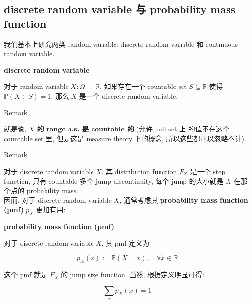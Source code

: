 \documentclass{qlnotes-export}
\begin{document}
\subsection{discrete random variable 与 probability mass function}\label{discrete-random-variable-ux4e0e-probability-mass-function}

我们基本上研究两类 random variable: discrete random variable 和 continuous random variable.

\begin{definition}{\protect{}\label{kn-discrete-random-variable}{\textbf{discrete
random variable}}}

对于 random variable \(X:\Omega\rightarrow{\mathbb{R}}\), 如果存在一个 countable set \(S \subseteq {\mathbb{R}}\) 使得 \({\mathbb{P}}(X \in S) = 1\), 那么 \(X\) 是一个 discrete random variable.

\end{definition}

\begin{qlremark}{Remark}

就是说, \textbf{\(X\) 的 range a.s. 是 countable 的} (允许 null set 上 的值不在这个 countable set 里, 但是这是 measure theory 下的概念, 所以这些都可以忽略不计).

\end{qlremark}

\begin{qlremark}{Remark}

对于 discrete random variable \(X\), 其 distribution function \(F_{X}\) 是一个 step function, 只有 countable 多个 jump discontinuity, 每个 jump 的大小就是 \(X\) 在那个点的 probability mass.\\
因而, 对于 discrete random variable \(X\), 通常考虑其 \textbf{probability mass function (pmf)} \(p_{X}\) 更加有用:

\begin{definition}{\protect{}\label{kn-probability-mass-function-pmf}{\textbf{probability
mass function (pmf)}}}

对于 discrete random variable \(X\), 其 pmf 定义为

\[p_{X}(x) := {\mathbb{P}}(X = x),\quad\forall x \in {\mathbb{R}}\]

\end{definition}

这个 pmf 就是 \(F_{X}\) 的 jump size function. 当然, 根据定义明显可得:

\[\sum\limits_{x}p_{X}(x) = 1\]

\end{qlremark}
\end{document}
